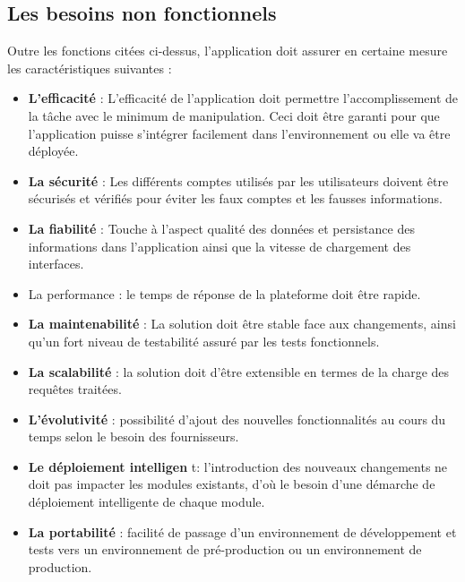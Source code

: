 \subsection{Les besoins non fonctionnels}
Outre les fonctions cit\'ees ci-dessus, l'application doit assurer en certaine mesure les caract\'eristiques suivantes :
\begin{itemize}
\item \textbf{L'efficacit\'e} : L'efficacit\'e de l'application doit permettre l'accomplissement de la t\^ache avec le minimum de manipulation. Ceci doit \^etre garanti pour que l'application puisse s'int\'egrer facilement dans l'environnement ou elle va \^etre d\'eploy\'ee.

\item \textbf{La s\'ecurit\'e} : Les diff\'erents comptes utilis\'es par les utilisateurs doivent \^etre s\'ecuris\'es et v\'erifi\'es pour \'eviter les faux comptes et les fausses informations.

\item \textbf{La fiabilit\'e} : Touche \`a l'aspect qualit\'e des donn\'ees et persistance des informations dans l'application ainsi que la vitesse de chargement des interfaces.
\item La performance : le temps de r\'eponse de la plateforme doit \^etre rapide.

\item \textbf{La maintenabilit\'e} : La solution doit \^etre stable face aux changements, ainsi qu'un fort niveau de testabilit\'e assur\'e par les tests fonctionnels.

\item \textbf{La scalabilit\'e} : la solution doit d'\^etre extensible en termes de la charge des requ\^etes trait\'ees.

\item \textbf{L'\'evolutivit\'e} : possibilit\'e d'ajout des nouvelles fonctionnalit\'es au cours du temps selon le besoin des fournisseurs.

\item \textbf{Le d\'eploiement intelligen} t: l'introduction des nouveaux changements ne doit pas impacter les modules existants, d'o\`u le besoin d'une d\'emarche de d\'eploiement intelligente de chaque module.

\item \textbf{La portabilit\'e} : facilit\'e de passage d'un environnement de d\'eveloppement et tests vers un environnement de pr\'e-production ou un environnement de production.
\end{itemize} 


